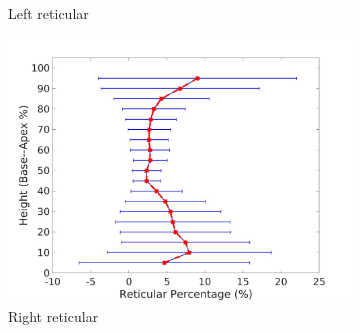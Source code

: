 \begin{figure}[H]
\begin{subfigure}{.42\linewidth}
  \caption{Left reticular}
  \label{fig:DiseaseAgainstHeight-c} 
\end{subfigure} 
\begin{subfigure}{.42\linewidth}%
  \includegraphics[width=\linewidth,trim={{.0\wd0} {.0\wd0} {.0\wd0} {.0\wd0}},clip]{QuantitativeAnalysis/Image/RightLungReticularDiseaseAgainstHeight.jpg}
  \caption{Right reticular}
  \label{fig:DiseaseAgainstHeight-d}
\end{subfigure}
\begin{subfigure}{.42\linewidth}%

\end{subfigure}
\end{figure}
